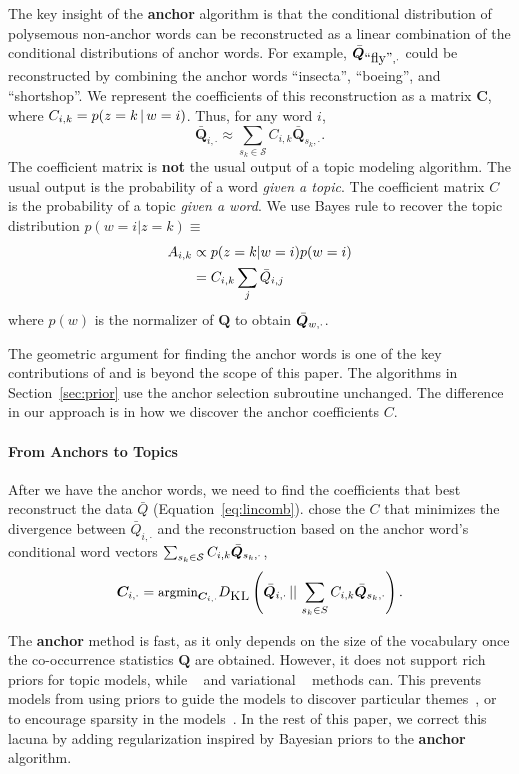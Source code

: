 The key insight of the {\bf anchor} algorithm is that the conditional
distribution of polysemous non-anchor words can be reconstructed as a
linear combination of the conditional distributions of anchor words.
For example, $\bar{\bm{Q}}_{\mbox{``fly''}, \cdot}$ could be reconstructed by combining
the anchor words ``insecta'', ``boeing'', and ``shortshop''.  We
represent the coefficients of this reconstruction as a matrix
$\bm{C}$, where $C_{i,k} = p(z=k \, | \, w=i)$.  Thus, for any word $i$,
\begin{equation}
  \bar{\bm{Q}}_{i,\cdot} \approx \sum_{s_k \in \mathcal{S}} C_{i,k} \bar{\bm{Q}}_{s_k, \cdot}.
\label{eq:lincomb}
\end{equation}
The coefficient matrix is {\bf not} the usual output of a topic modeling
algorithm.  The usual output is the probability of a word \emph{given a topic}.
The coefficient matrix $C$ is the probability of a topic \emph{given a word}.
We use Bayes rule to recover the topic distribution $p(w=i|z=k) \equiv $
\begin{align}
A_{i,k}  & \propto p(z=k|w=i) p(w=i)  \notag \\
   & = C_{i,k} \sum_{j}
{\bar{Q}_{i,j}}
\label{eq:coef-to-topic}
\end{align}
where $p(w)$ is the normalizer of $\bm{Q}$ to obtain $\bar{\bm{Q}}_{w, \cdot}$.

The geometric argument for finding the anchor words is one of the key
contributions of \citet{Arora-2012} and is beyond the scope of
this paper.  The algorithms in Section~\ref{sec:prior} use the anchor selection
subroutine unchanged.  The difference in our approach is in how we discover the
anchor coefficients $C$.

\paragraph{From Anchors to Topics}

After we have the anchor words, we need to find the coefficients that
best reconstruct the data $\bar{Q}$ (Equation~\ref{eq:lincomb}).
\citet{Arora-2012} chose the $C$ that minimizes the 
divergence between $\bar{Q}_{i,\cdot}$ and the reconstruction based on
the anchor word's conditional word vectors $\sum_{s_k \in \mathcal{S}}
C_{i,k} \bar{\bm{Q}}_{s_k, \cdot}$,
\begin{equation}
\label{eq:anchor}
\begin{small}
\bm{C}_{i,\cdot} = \text{argmin}_{\bm{C}_{i,\cdot}} \kl{\cd{i}}{\sum_{s_k \in S} C_{i,k} \cd{s_k}}.
\end{small}
\end{equation}

The {\bf anchor} method is fast, as it only depends on the size of the
vocabulary once the co-occurrence statistics $\bm Q$ are obtained.  However, it does
not support rich priors for topic models, while ~\cite{griffiths-04} and
variational ~\cite{blei-03} methods can.  This prevents models from
using priors to guide the models to discover particular themes~\cite{zhai-12},
or to encourage sparsity in the models~\cite{yao-09}.  In the rest of this
paper, we correct this lacuna by adding regularization inspired by Bayesian
priors to the {\bf anchor} algorithm.